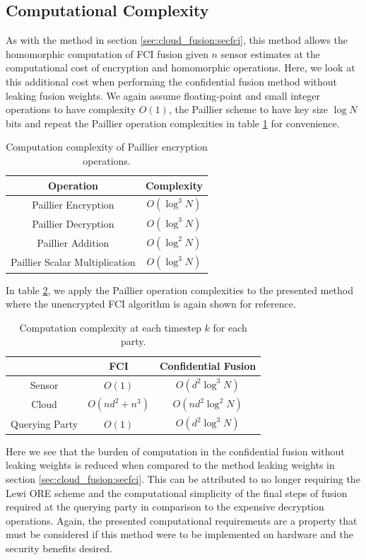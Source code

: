 \subsection{Computational Complexity}\label{subsec:cloud_fusion:secfci2_comp_complexity}
As with the method in section \ref{sec:cloud_fusion:secfci}, this method allows the homomorphic computation of FCI fusion given $n$ sensor estimates at the computational cost of encryption and homomorphic operations. Here, we look at this additional cost when performing the confidential fusion method without leaking fusion weights. We again assume floating-point and small integer operations to have complexity $O(1)$, the Paillier scheme to have key size $\log{N}$ bits and repeat the Paillier operation complexities in table \ref{tab:cloud_fusion:secfci2_op_complexity} for convenience. 
\begin{table}[htbp]
    \centering
    \caption{Computation complexity of Paillier encryption operations.}
    \label{tab:cloud_fusion:secfci2_op_complexity}
    \begin{tabular}{|c|c|}
        \hline
        \textbf{Operation} & \textbf{Complexity} \\ 
        \hline
        Paillier Encryption & $O(\log^3{N})$ \\ 
        Paillier Decryption & $O(\log^3{N})$ \\ 
        Paillier Addition & $O(\log^2{N})$ \\ 
        Paillier Scalar Multiplication & $O(\log^3{N})$ \\ 
        \hline
    \end{tabular}
\end{table}
In table \ref{tab:cloud_fusion:secfci2_complexity}, we apply the Paillier operation complexities to the presented method where the unencrypted FCI algorithm is again shown for reference.
\begin{table}[tb]
    \centering
    \caption{Computation complexity at each timestep $k$ for each party.}
    \label{tab:cloud_fusion:secfci2_complexity}
    \begin{tabular}{|c|c|c|}
       \hline
        & \textbf{FCI} & \textbf{Confidential Fusion} \\ 
       \hline
       Sensor & $O(1)$ & $O\left(d^2\log^3{N}\right)$ \\ 
       Cloud & $O(nd^2 + n^3)$ & $O\left(nd^2\log^2{N}\right)$ \\ 
       Querying Party & $O(1)$ & $O\left(d^2\log^3{N}\right)$ \\ 
       \hline
    \end{tabular}
 \end{table}
Here we see that the burden of computation in the confidential fusion without leaking weights is reduced when compared to the method leaking weights in section \ref{sec:cloud_fusion:secfci}. This can be attributed to no longer requiring the Lewi ORE scheme and the computational simplicity of the final steps of fusion required at the querying party in comparison to the expensive decryption operations. Again, the presented computational requirements are a property that must be considered if this method were to be implemented on hardware and the security benefits desired.

